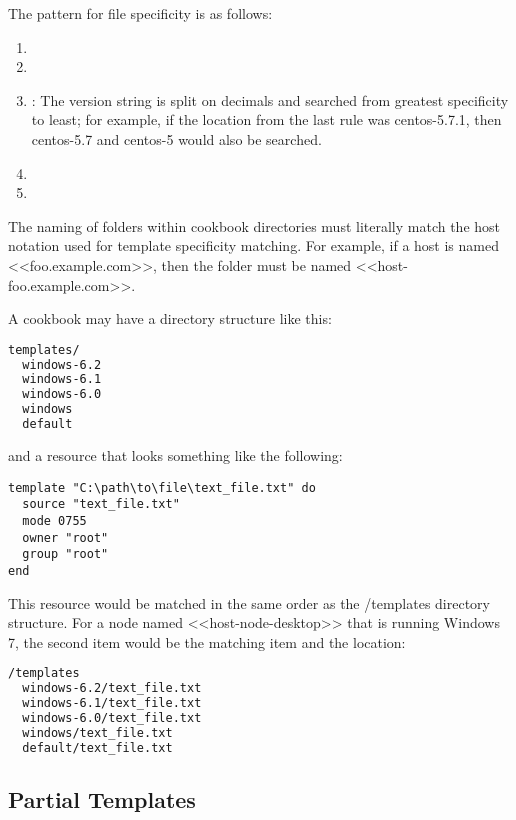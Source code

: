 The pattern for file specificity is as follows:

\begin{enumerate}
  \item {}
  \item {}
  \item {}: The version string is split on decimals and searched from greatest specificity to least; for example, if the location from the last rule was centos-5.7.1, then centos-5.7 and centos-5 would also be searched.
  \item {}
  \item {}
\end{enumerate}

The naming of folders within cookbook directories must literally match the host notation used for template specificity matching. For example, if a host is named <<foo.example.com>>, then the folder must be named <<host-foo.example.com>>.

A cookbook may have a  directory structure like this:

\begin{lstlisting}[language=Bash,label=lst:cookbook-templates7]
templates/
  windows-6.2
  windows-6.1
  windows-6.0
  windows
  default
\end{lstlisting}

and a resource that looks something like the following:

\begin{lstlisting}[label=lst:cookbook-templates8]
template "C:\path\to\file\text_file.txt" do
  source "text_file.txt"
  mode 0755
  owner "root"
  group "root"
end
\end{lstlisting}

This resource would be matched in the same order as the /templates directory structure. For a node named <<host-node-desktop>> that is running Windows 7, the second item would be the matching item and the location:

\begin{lstlisting}[language=Bash,label=lst:cookbook-templates9]
/templates
  windows-6.2/text_file.txt
  windows-6.1/text_file.txt
  windows-6.0/text_file.txt
  windows/text_file.txt
  default/text_file.txt
\end{lstlisting}

\subsection{Partial Templates}

